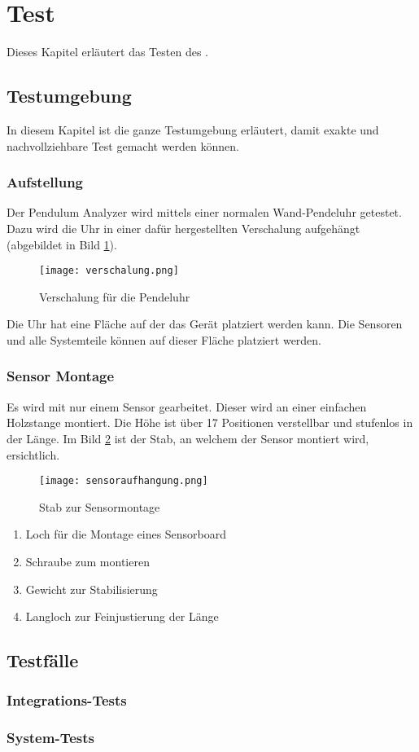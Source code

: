 \section{Test}
Dieses Kapitel erläutert das Testen des \documenttitle.
	\subsection{Testumgebung}
    In diesem Kapitel ist die ganze Testumgebung erläutert, damit exakte und nachvollziehbare Test gemacht werden können.
    \subsubsection{Aufstellung}
    Der Pendulum Analyzer wird mittels einer normalen Wand-Pendeluhr getestet. Dazu wird die Uhr in einer dafür hergestellten Verschalung aufgehängt (abgebildet in Bild \ref{fig:verschalung}).
    \begin{figure}[H]
        \centering
        \texttt{[image: verschalung.png]}
        \caption{Verschalung für die Pendeluhr}
        \label{fig:verschalung}
    \end{figure}

    \noindent Die Uhr hat eine Fläche auf der das Gerät platziert werden kann.
    Die Sensoren und alle Systemteile können auf dieser Fläche platziert werden.
    
    \clearpage
    \subsubsection{Sensor Montage}
    Es wird mit nur einem Sensor gearbeitet.
    Dieser wird an einer einfachen Holzstange montiert.
    Die Höhe ist über 17 Positionen verstellbar und stufenlos in der Länge. Im Bild \ref{fig:sensor_montage} ist der Stab, an welchem der Sensor montiert wird, ersichtlich.
    \begin{figure}[H]
        \centering
        \texttt{[image: sensoraufhangung.png]}
        \caption{Stab zur Sensormontage}
        \label{fig:sensor_montage}
    \end{figure}
    \begin{enumerate}
        \item Loch für die Montage eines Sensorboard
        \item Schraube zum montieren
        \item Gewicht zur Stabilisierung
        \item Langloch zur Feinjustierung der Länge
    \end{enumerate}

    \clearpage
    \subsection{Testfälle}
    	\subsubsection{Integrations-Tests}
    		
    	\subsubsection{System-Tests}